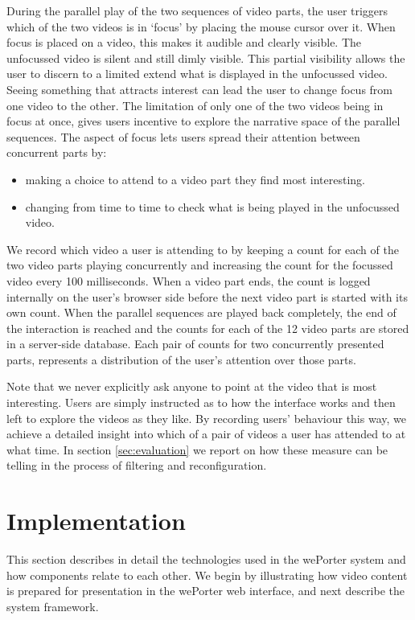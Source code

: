 During the parallel play of the two sequences of video parts, the user triggers which of the two videos is in `focus' by placing the mouse cursor over it. When focus is placed on a video, this makes it audible and clearly visible. The unfocussed video is silent and still dimly visible. This partial visibility allows the user to discern to a limited extend what is displayed in the unfocussed video. Seeing something that attracts interest can lead the user to change focus from one video to the other. The limitation of only one of the two videos being in focus at once, gives users incentive to explore the narrative space of the parallel sequences. The aspect of focus lets users spread their attention between concurrent parts by:
\begin{itemize}
  \item making a choice to attend to a video part they find most interesting.
  \item changing from time to time to check what is being played in the unfocussed video.
\end{itemize}

We record which video a user is attending to by keeping a count for each of the two video parts playing concurrently and increasing the count for the focussed video every 100 milliseconds. When a video part ends, the count is logged internally on the user's browser side before the next video part is started with its own count. When the parallel sequences are played back completely, the end of the interaction is reached and the counts for each of the 12 video parts are stored in a server-side database. Each pair of counts for two concurrently presented parts, represents a distribution of the user's attention over those parts.

Note that we never explicitly ask anyone to point at the video that is most interesting. Users are simply instructed as to how the interface works and then left to explore the videos as they like. By recording users' behaviour this way, we achieve a detailed insight into which of a pair of videos a user has attended to at what time. In section \ref{sec:evaluation} we report on how these measure can be telling in the process of filtering and reconfiguration. 

\section{Implementation}
\label{sec:implementation}

This section describes in detail the technologies used in the wePorter system and how components relate to each other. We begin by illustrating how video content is prepared for presentation in the wePorter web interface, and next describe the system framework. 

